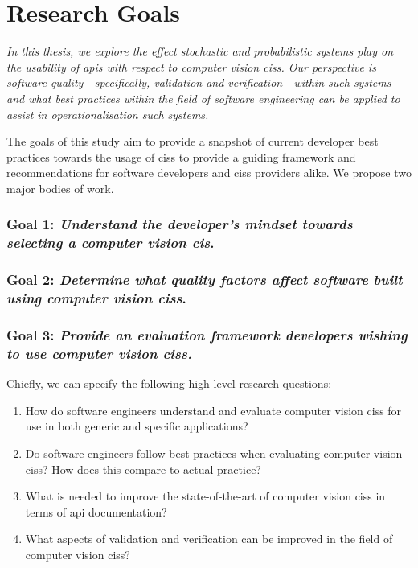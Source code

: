 \section{Research Goals}
\label{sec:introduction:goals}

\itshape
In this thesis, we explore the effect stochastic and probabilistic systems play on the usability of \glspl{api} with respect to computer vision \glspl{cis}. Our perspective is software quality---specifically, validation and verification---within such systems and what best practices within the field of software engineering can be applied to assist in operationalisation such systems.
\upshape

The goals of this study aim to provide a snapshot of current developer best practices towards the usage of \glspl{cis} to provide a guiding framework and recommendations for software developers and \glspl{cis} providers alike. We propose two major bodies of work.

\subsubsection*{Goal 1: \textit{Understand the developer's mindset towards selecting a computer vision \gls{cis}}.}

\subsubsection*{Goal 2: \textit{Determine what quality factors affect software built using computer vision \glspl{cis}}.}

\subsubsection*{Goal 3: \textit{Provide an evaluation framework developers wishing to use computer vision \glspl{cis}.}}

Chiefly, we can specify the following high-level research questions:

\begin{enumerate}[label=\textbf{RQ\arabic*}., leftmargin=4\parindent]
  \item How do software engineers understand and evaluate computer vision \glspl{cis} for use in both generic and specific applications?
  \item Do software engineers follow best practices when evaluating computer vision \glspl{cis}? How does this compare to actual practice?
  \item What is needed to improve the state-of-the-art of computer vision \glspl{cis} in terms of \gls{api} documentation?
  \item What aspects of validation and verification can be improved in the field of computer vision \glspl{cis}?
\end{enumerate}

